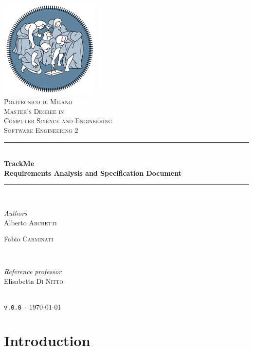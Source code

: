\documentclass[12pt]{article}
\def \thisDocVersion {\texttt{v.0.0}}
\begin{document}
\begin{titlepage}
  \newcommand{\HRule}{\rule{\linewidth}{0.5mm}}
  \center
  \includegraphics[width=140pt]{polimi.png}\\[1cm]
  \textsc{\LARGE Politecnico di Milano}\\[1cm]
  \textsc{\Large Master's Degree in \\Computer Science and Engineering}\\[0.5cm]
  \textsc{\large Software Engineering 2}\\[0.5cm]
  \HRule \\[0.4cm]
  { \huge \bfseries TrackMe\\[0.4cm] Requirements Analysis and Specification Document }\\[0.4cm]

  \HRule \\[1cm]
  \begin{minipage}{0.4\textwidth}
  \begin{flushleft} \large
  \emph{Authors}\\
  Alberto \textsc{Archetti}

  Fabio \textsc{Carminati}
  \end{flushleft}
  \end{minipage}
  ~
  \begin{minipage}{0.4\textwidth}
  \begin{flushright} \large
  \emph{Reference professor} \\
  Elisabetta \textsc{Di Nitto}
  \end{flushright}
  \end{minipage}\\[1cm]
  {\large \thisDocVersion\ - \today}\\[1cm]
  \vfill
\end{titlepage}

\clearpage
{}
\nonumber
\tableofcontents
\clearpage
{}

\clearpage
\section{Introduction}
\label{sec:intro}
\end{document}
